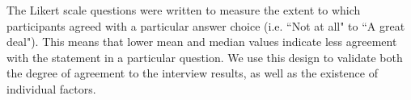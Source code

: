 The Likert scale questions were written to measure the extent to which participants agreed with a particular answer choice (i.e. ``Not at all" to ``A great deal"). This means that lower mean and median values indicate less agreement with the statement in a particular question.
We use this design to validate both the degree of agreement to the interview results, as well as the existence of individual factors.
